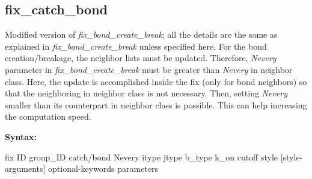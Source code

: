 \subsection{fix\_catch\_bond}

Modified version of \emph{fix\_bond\_create\_break}; all the details are the same as explained in \emph{fix\_bond\_create\_break} unless specified here. For the bond creation/breakage, the neighbor lists must be updated. Therefore, \emph{Nevery} parameter in \emph{fix\_bond\_create\_break} must be greater than \emph{Nevery} in neighbor class. Here, the update is accomplished inside the fix (only for bond neighbors) so that the neighboring in neighbor class is not necessary. Then, setting \emph{Nevery} smaller than its counterpart in neighbor class is possible. This can help increasing the computation speed.


{\bfseries Syntax:}


fix ID group\_ID catch/bond Nevery itype jtype b\_type k\_on cutoff style [style-arguments] optional-keywords parameters


